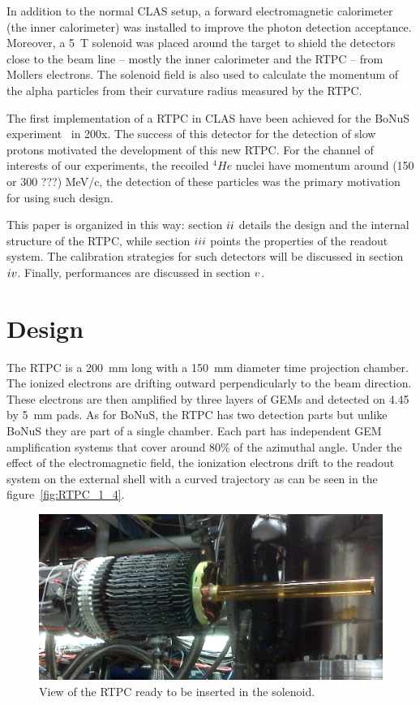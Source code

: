 \documentclass[reprint, amsmath,amssymb, aps]{revtex4}
\newcommand{\RNum}[1]{\uppercase\expandafter{\romannumeral #1\relax}}
\begin{document}
In addition to the normal CLAS setup, a forward electromagnetic calorimeter (the inner calorimeter) was installed to improve the photon detection acceptance. Moreover, a 5~T solenoid was placed around the target to shield the detectors close to the beam line -- mostly the inner calorimeter and the RTPC -- from Mollers electrons. The solenoid field is also used to calculate the momentum of the alpha particles from their curvature radius measured by the RTPC.

The first implementation of a RTPC in CLAS have been achieved for the BoNuS experiment~\cite{BONUS} in 200x. The success of this detector for the detection of slow protons motivated the development of this new RTPC. For the channel of interests of our experiments, the recoiled $^{4}He$ nuclei have momentum around (150 or 300 ???) MeV/c, the detection of these particles was the primary motivation for using such design. 

This paper is organized in this way: section $\RNum{2}$ details the design and the internal structure of the RTPC, while section $\RNum{3}$ points the properties of the readout system. The calibration strategies for such detectors will be discussed in section $\RNum{4}$. Finally, performances are discussed in section $\RNum{5}$.

 
\section{Design}

The RTPC is a 200~mm long with a 150~mm diameter time projection chamber. The ionized electrons are drifting outward perpendicularly to the beam direction. These electrons are then amplified by three layers of GEMs and detected on 4.45 by 5~mm pads. As for BoNuS, the RTPC has two detection parts but unlike BoNuS they are part of a single chamber. Each part has independent GEM amplification systems that cover around 80\% of the azimuthal angle. Under the effect of the electromagnetic field, the ionization electrons drift to the readout system on the external shell with a curved trajectory as can be seen in the figure~\ref{fig:RTPC_1_4}.

\begin{figure}[tb]
\centering
\includegraphics[scale=0.19]{fig/RTPC_exp.png}
\caption[]{\small\sf View of the RTPC ready to be inserted in the solenoid. } 
\label{fig:RTPC2}
\end{figure}
\end{document}
